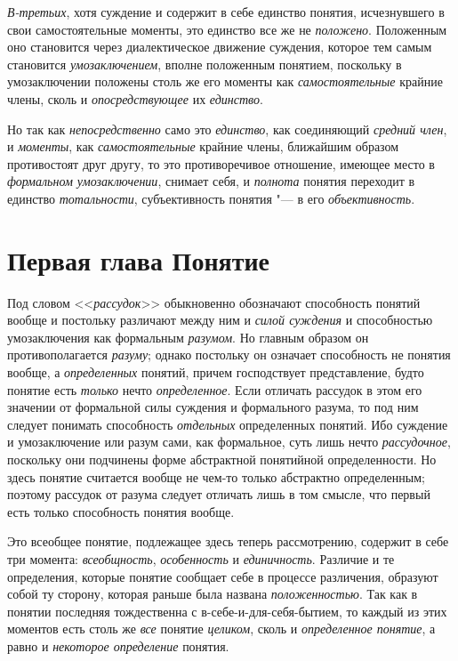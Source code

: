 {{\em В-третьих}, хотя
суждение и содержит в себе единство понятия, исчезнувшего в свои
самостоятельные моменты, это единство все же не
{\em положено}.
Положенным оно становится через диалектическое движение
суждения, которое тем самым становится
{\em умозаключением},
вполне положенным понятием, поскольку в умозаключении
положены столь же его моменты как
{\em самостоятельные}
крайние члены, сколь и
{\em опосредствующее} их
{\em единство}.

Но так как
{\em непосредственно}
само это {\em единство},
как соединяющий
{\em средний член}, и
{\em моменты}, как
{\em самостоятельные}
крайние члены, ближайшим образом противостоят друг другу, то
это противоречивое отношение, имеющее место в
{\em формальном умозаключении},
снимает себя, и
{\em полнота} понятия
переходит в единство {\em тотальности},
субъективность понятия "--- в его
{\em объективность}.

\bigskip

\chapter[{\em Первая глава} Понятие]{Первая глава Понятие}
Под словом <<{\em рассудок}>>
обыкновенно обозначают способность понятий вообще и постольку
различают между ним и {\em силой
суждения} и способностью умозаключения как формальным
{\em разумом}. Но главным
образом он противополагается
{\em разуму}; однако
постольку он означает способность не понятия вообще, а
{\em определенных}
понятий, причем господствует представление, будто понятие
есть {\em только} нечто
{\em определенное}. Если
отличать рассудок в этом его значении от формальной силы суждения и
формального разума, то под ним следует понимать способность
{\em отдельных}
определенных понятий. Ибо суждение и умозаключение или разум
сами, как формальное, суть лишь нечто
{\em рассудочное},
поскольку они подчинены форме абстрактной понятийной
определенности. Но здесь понятие считается вообще не чем-то только
абстрактно определенным; поэтому рассудок от разума следует отличать лишь в
том смысле, что первый есть только способность понятия вообще.

Это всеобщее понятие, подлежащее здесь теперь рассмотрению,
содержит в себе три момента:
{\em всеобщность},
{\em особенность} и
{\em единичность}.
Различие и те определения, которые понятие сообщает себе в
процессе различения, образуют собой ту сторону, которая раньше была названа
{\em положенностью}. Так
как в понятии последняя тождественна с в-себе-и-для-себя-бытием, то каждый
из этих моментов есть столь же
{\em все} понятие
{\em целиком}, сколь и
{\em определенное понятие},
а равно и {\em некоторое
определение} понятия.

}
